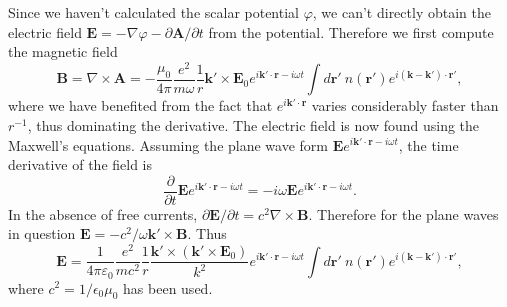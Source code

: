 Since we haven't calculated the scalar potential $\varphi$, we can't directly obtain the electric field $\mathbf{E} = -\nabla \varphi - \partial \mathbf{A}/ \partial t$ from the potential.  Therefore we first compute the magnetic field
\begin{equation}
\mathbf{B} = \nabla \times \mathbf{A} = -\frac{\mu_0}{4 \pi} \frac{e^2}{m\omega}\frac{1}{r} \mathbf{k}' \times \mathbf{E}_0  e^{i \mathbf{k}'\cdot\mathbf{r}-i \omega t} \int d\mathbf{r}' \  n(\mathbf{r}')  e^{i (\mathbf{k}-\mathbf{k}')\cdot\mathbf{r}'},
\end{equation}
where we have benefited from the fact that $e^{i \mathbf{k}'\cdot\mathbf{r}}$ varies considerably faster than $r^{-1}$, thus dominating the derivative. The electric field is now found using the Maxwell's equations. Assuming the plane wave form $\mathbf{E} e^{i \mathbf{k}'\cdot\mathbf{r}-i \omega t}$, the time derivative of the field is
\begin{equation}
\frac{\partial}{\partial t} \mathbf{E} e^{i \mathbf{k}'\cdot\mathbf{r}-i \omega t}
= -i \omega \mathbf{E} e^{i \mathbf{k}'\cdot\mathbf{r}-i \omega t}.
\end{equation}
In the absence of free currents, $\partial \mathbf{E} /\partial t = c^2 \nabla \times \mathbf{B}$. Therefore for the plane waves in question $\mathbf{E} = -c^2/\omega \mathbf{k}' \times \mathbf{B}$. Thus
\begin{equation}
\mathbf{E} = \frac{1}{4 \pi \varepsilon_0} \frac{e^2}{mc^2}\frac{1}{r} \frac{\mathbf{k}' \times(\mathbf{k}' \times \mathbf{E}_0)}{k^2}  e^{i \mathbf{k}'\cdot\mathbf{r}-i \omega t} \int d\mathbf{r}' \  n(\mathbf{r}')  e^{i (\mathbf{k}-\mathbf{k}')\cdot\mathbf{r}'},
\end{equation}
where $c^2 = 1/\epsilon_0 \mu_0$ has been used.

